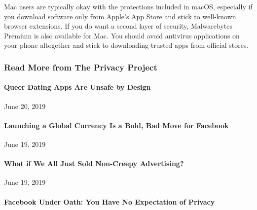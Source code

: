 Mac users are typically okay with the protections included in macOS,
especially if you download software only from Apple's App Store and
stick to well-known browser extensions. If you do want a second layer of
security, Malwarebytes Premium is also available for Mac. You should
avoid antivirus applications on your phone altogether and stick to
downloading trusted apps from official stores.~

\hypertarget{read-more-from-the-privacy-project}{%
\subsubsection{Read More from The Privacy
Project}\label{read-more-from-the-privacy-project}}

\href{https://www.nytimes.com/2019/06/20/opinion/queer-dating-apps.html}{}

\hypertarget{queer-dating-apps-are-unsafe-by-design}{%
\paragraph{Queer Dating Apps Are Unsafe by
Design}\label{queer-dating-apps-are-unsafe-by-design}}

June 20, 2019

\href{https://www.nytimes.com/2019/06/19/opinion/facebook-currency-libra.html}{}

\hypertarget{launching-a-global-currency-is-a-bold-bad-move-for-facebook}{%
\paragraph{Launching a Global Currency Is a Bold, Bad Move for
Facebook}\label{launching-a-global-currency-is-a-bold-bad-move-for-facebook}}

June 19, 2019

\href{https://www.nytimes.com/2019/06/19/opinion/facebook-google-privacy.html}{}

\hypertarget{what-if-we-all-just-sold-non-creepy-advertising}{%
\paragraph{What if We All Just Sold Non-Creepy
Advertising?}\label{what-if-we-all-just-sold-non-creepy-advertising}}

June 19, 2019

\href{https://www.nytimes.com/2019/06/18/opinion/facebook-court-privacy.html}{}

\hypertarget{facebook-under-oath-you-have-no-expectation-of-privacy}{%
\paragraph{Facebook Under Oath: You Have No Expectation of
Privacy}\label{facebook-under-oath-you-have-no-expectation-of-privacy}}

